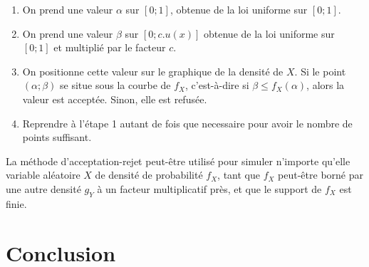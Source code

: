 \documentclass{article}
\begin{document}
\begin{enumerate}
\item On prend une valeur $\alpha$ sur $[0;1]$, obtenue de la loi uniforme sur $[0;1]$.
\item On prend une valeur $\beta$ sur $[0;c.u(x)]$ obtenue de la loi uniforme sur $[0;1]$ et multiplié par le facteur $c$.
\item On positionne cette valeur sur le graphique de la densité de $X$. Si le point $(\alpha; \beta)$ se situe sous la courbe de $f_X$, c'est-à-dire si $\beta \leq f_X(\alpha)$, alors la valeur est acceptée. Sinon, elle est refusée.
\item Reprendre à l'étape 1 autant de fois que necessaire pour avoir le nombre de points suffisant.
\end{enumerate}
\begin{center}
\end{center}
La méthode d'acceptation-rejet peut-être utilisé pour simuler n'importe qu'elle variable aléatoire $X$ de densité de probabilité $f_X$, tant que $f_X$ peut-être borné par une autre densité $g_Y$ à un facteur multiplicatif près, et que le support de $f_X$ est finie.
\section{Conclusion}
\end{document}
